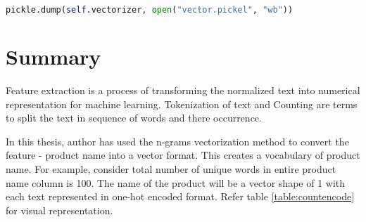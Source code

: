 \begin{lstlisting}[language=Python,label=pickle, caption={Pickle vectorization}]
    pickle.dump(self.vectorizer, open("vector.pickel", "wb"))
\end{lstlisting}

\section{Summary}

Feature extraction is a process of transforming the normalized text into numerical representation for machine learning.  Tokenization of text and Counting are terms to split the text in sequence of words and there occurrence. 

In this thesis, author has used the n-grams vectorization method to convert the feature - product name into a vector format. This creates a vocabulary of product name. For example, consider total number of unique words in entire product name column is 100. The name of the product will be a vector shape of 1  with each text represented in one-hot encoded format. Refer table \ref{table:countencode} for visual representation.